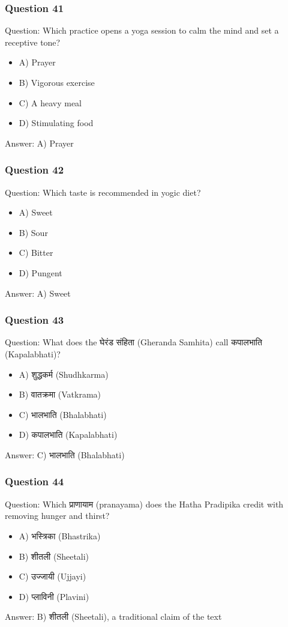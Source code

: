 \begin{frame}[fragile]\frametitle{Question 41}
Question: Which practice opens a yoga session to calm the mind and set a receptive tone?
\begin{itemize}
\item A) Prayer
\item B) Vigorous exercise
\item C) A heavy meal
\item D) Stimulating food
\end{itemize}
Answer: A) Prayer
\end{frame}

\begin{frame}[fragile]\frametitle{Question 42}
Question: Which taste is recommended in yogic diet?
\begin{itemize}
\item A) Sweet
\item B) Sour
\item C) Bitter
\item D) Pungent
\end{itemize}
Answer: A) Sweet
\end{frame}

\begin{frame}[fragile]\frametitle{Question 43}
Question: What does the घेरंड संहिता (Gheranda Samhita) call कपालभाति (Kapalabhati)?
\begin{itemize}
\item A) शुद्धकर्म (Shudhkarma)
\item B) वातक्रमा (Vatkrama)
\item C) भालभाति (Bhalabhati)
\item D) कपालभाति (Kapalabhati)
\end{itemize}
Answer: C) भालभाति (Bhalabhati)
\end{frame}

\begin{frame}[fragile]\frametitle{Question 44}
Question: Which प्राणायाम (pranayama) does the Hatha Pradipika credit with removing hunger and thirst?
\begin{itemize}
\item A) भस्त्रिका (Bhastrika)
\item B) शीतली (Sheetali)
\item C) उज्जायी (Ujjayi)
\item D) प्लाविनी (Plavini)
\end{itemize}
Answer: B) शीतली (Sheetali), a traditional claim of the text
\end{frame}

